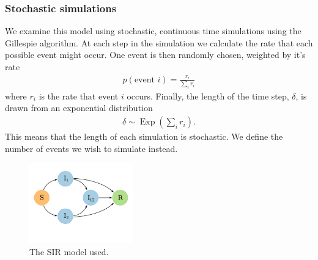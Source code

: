 \subsubsection{Stochastic simulations}

We examine this model using stochastic, continuous time simulations using the Gillespie algorithm.
At each step in the simulation we calculate the rate that each possible event might occur.
One event is then randomly chosen, weighted by it's rate
\begin{align}
  p(\text{event } i) = \frac{r_i}{\sum_i r_i}
\end{align}
where $r_i$ is the rate that event $i$ occurs.
Finally, the length of the time step, $\delta$, is drawn from an exponential distribution 
\begin{align}
  \delta \sim \operatorname{Exp}\left(\sum_i r_i  \right).
\end{align}
This means that the length of each simulation is stochastic. 
We define the number of events we wish to simulate instead.


\begin{figure}[t]
\centering
  \includegraphics[width=0.4\textwidth]{imgs/SIRoption1.pdf}
  \caption{The SIR model used.}
  \label{f:sir}
\end{figure}



